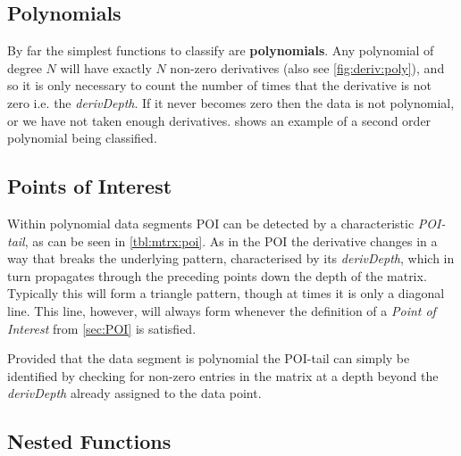 \documentclass[main.tex]{subfiles}
\begin{document}
    \subsection{Polynomials}
    
      By far the simplest functions to classify are \textbf{polynomials}. Any polynomial of degree $N$ will have exactly $N$ non-zero derivatives (also see \cref{fig:deriv:poly}), and so it is only necessary to count the number of times that the derivative is not zero i.e. the \textit{derivDepth}. If it never becomes zero then the data is not polynomial, or we have not taken enough derivatives.  shows an example of a second order polynomial being classified.
      
    \subsection{Points of Interest}
      
      Within polynomial data segments POI can be detected by a characteristic \textit{POI-tail}, as can be seen in \cref{tbl:mtrx:poi}. As in the POI the derivative changes in a way that breaks the underlying pattern, characterised by its \textit{derivDepth}, which in turn propagates through the preceding points down the depth of the matrix. Typically this will form a triangle pattern, though at times it is only a diagonal line. This line, however, will always form whenever the definition of a \textit{Point of Interest} from \cref{sec:POI} is satisfied.
      
          
      
      Provided that the data segment is polynomial the POI-tail can simply be identified by checking for non-zero entries in the matrix at a depth beyond the \textit{derivDepth} already assigned to the data point. 
    
    \subsection{Nested Functions}
      \label{sec:con:nest}
      
\end{document}
